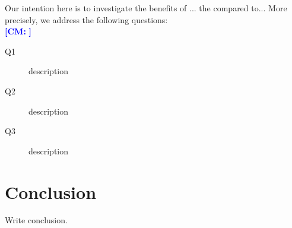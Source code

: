 \documentclass[11pt, DIV=12]{scrartcl}
\theoremstyle{definition}
\newcommand{\cm}[1]{{{\textcolor{blue}{\textbf{[CM:} {#1}\textbf{]}}}}}
\begin{document}
Our intention here is to investigate the benefits of ... the compared to...
More precisely, we address the following questions:\\

\cm{}
\begin{description}
	\item[Q1] description
	\item[Q2] description
	\item[Q3] description
\end{description}

\section{Conclusion}
Write conclusion.			

 

	
\end{document}
